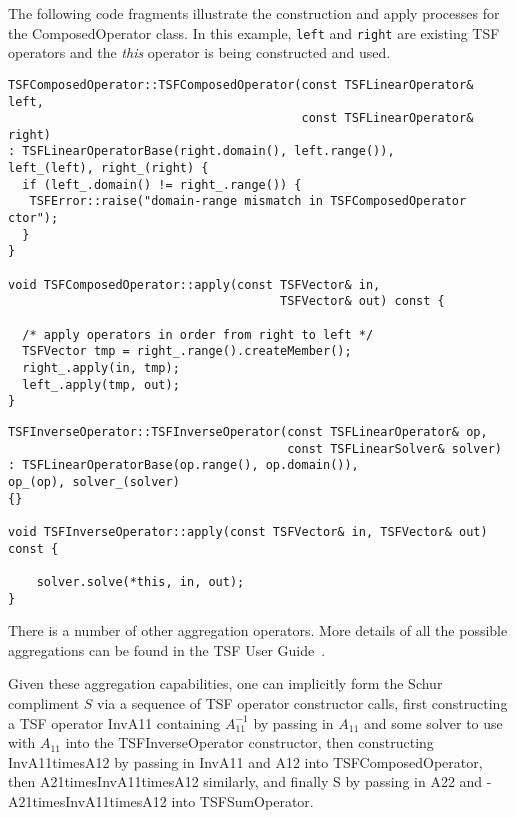 \documentclass[12pt,relax]{SANDreport}
\begin{document}
\begin{enumerate}
The following code fragments illustrate the construction and apply processes for the 
ComposedOperator class.  In this example, {\tt left} and {\tt right} are existing TSF operators
and the {\it this} operator is being constructed and used.

\begin{verbatim}
TSFComposedOperator::TSFComposedOperator(const TSFLinearOperator& left,
                                         const TSFLinearOperator& right)
: TSFLinearOperatorBase(right.domain(), left.range()),
left_(left), right_(right) {
  if (left_.domain() != right_.range()) {
   TSFError::raise("domain-range mismatch in TSFComposedOperator ctor");
  }
}

void TSFComposedOperator::apply(const TSFVector& in, 
                                      TSFVector& out) const {

  /* apply operators in order from right to left */
  TSFVector tmp = right_.range().createMember();
  right_.apply(in, tmp);
  left_.apply(tmp, out);
}

\end{verbatim}


\begin{verbatim}
TSFInverseOperator::TSFInverseOperator(const TSFLinearOperator& op,
                                       const TSFLinearSolver& solver)
: TSFLinearOperatorBase(op.range(), op.domain()), 
op_(op), solver_(solver)
{}

void TSFInverseOperator::apply(const TSFVector& in, TSFVector& out) const {

	solver.solve(*this, in, out);
}

\end{verbatim}

There is a number of other aggregation operators.  More details of all the possible 
aggregations can be found in the TSF User Guide~\cite{TSF-User-Guide}.

Given these aggregation capabilities, one can implicitly form the Schur compliment $S$ via
a sequence of TSF operator constructor calls, first constructing a TSF operator
InvA11 containing $A_{11}^{-1}$ by passing
in $A_{11}$ and some solver to use with $A_{11}$ into the TSFInverseOperator constructor, 
then constructing InvA11timesA12 by passing in InvA11 and A12 into TSFComposedOperator, then 
A21timesInvA11timesA12 similarly, and finally S by passing in A22 and -A21timesInvA11timesA12
into TSFSumOperator.

\end{enumerate}
\end{document}
